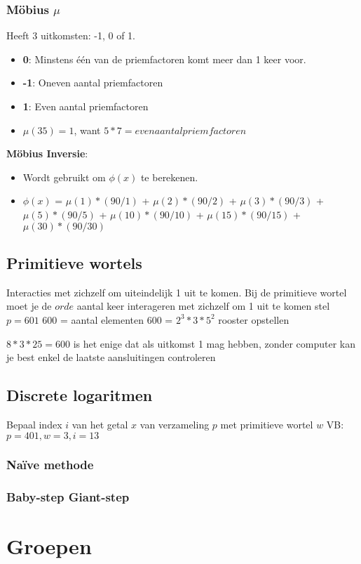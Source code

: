 \documentclass[12pt]{report}
\newcommand{\todo}[1] {
\color{red}\textunderscore{\textit{TODO: #1}}
\color{black}
}
\newcommand{\important}[1] {\textbf{\color{orange}#1}}
\begin{document}
\subsection{Möbius $\mu$}
Heeft 3 uitkomsten: -1, 0 of 1.
\begin{itemize}
 \item \important{0}: Minstens één van de priemfactoren komt meer dan 1 keer voor.
 \item \important{-1}: Oneven aantal priemfactoren
 \item \important{1}: Even aantal priemfactoren
 \item $\mu(35) = 1 $, want $ 5 * 7 = even aantal priemfactoren$
\end{itemize}
 
\important{Möbius Inversie}:
\begin{itemize}
 \item Wordt gebruikt om $\phi(x)$ te berekenen.
 \item $\phi(x)$ = $\mu(1) * (90/1)$ 
  \newline +  $\mu(2) * (90/2)$
  \newline +  $\mu(3) * (90/3)$
  \newline +  $\mu(5) * (90/5)$
  \newline +  $\mu(10) * (90/10)$
  \newline +  $\mu(15) * (90/15)$
  \newline +  $\mu(30) * (90/30)$
\end{itemize}

\section{Primitieve wortels}
Interacties met zichzelf om uiteindelijk 1 uit te komen. 
Bij de primitieve wortel moet je de $orde$ aantal keer interageren
met zichzelf om 1 uit te komen
\newline
stel $p = 601$
600 = aantal elementen 
600 = $2^3 * 3 * 5^2$
\newline
rooster opstellen \todo{rooster}
$8 * 3 * 25 = 600$ is het enige dat als uitkomst 1 mag hebben,
zonder computer kan je best enkel de laatste aansluitingen controleren

\section{Discrete logaritmen}
Bepaal index $i$ van het getal $x$ van verzameling $p$ met primitieve wortel $w$
\newline
VB: $p = 401, w=3, i=13$
\subsection{Naïve methode}

\subsection{Baby-step Giant-step}
\chapter{Groepen}
\label{ch:groepen}
\end{document}
